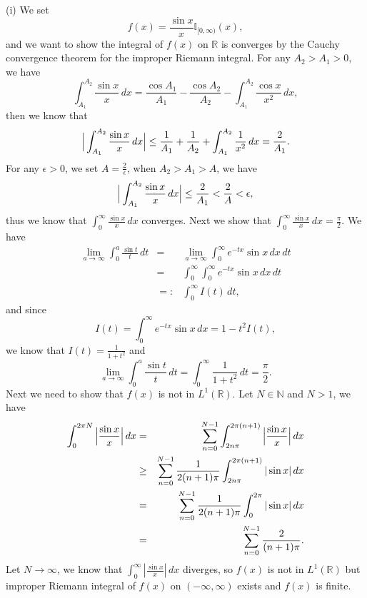\documentclass[12pt]{article}
\begin{document}
(i) We set
\begin{equation*}
    f(x) = \frac{\sin x}{x} \mathbb{I}_{[0, \infty)} (x),
\end{equation*}
and we want to show the integral of $f(x)$ on $\mathbb{R}$ is converges by the Cauchy convergence theorem for the improper Riemann integral. For any $A_{2} > A_{1} > 0$, we have
\begin{equation*}
    \int_{A_{1}}^{A_{2}} \frac{\sin x}{x} \, d x = \frac{\cos A_{1}}{A_{1}} - \frac{\cos A_{2}}{A_{2}} - \int_{A_{1}}^{A_{2}} \frac{\cos x}{x^{2}} \, d x,
\end{equation*}
then we know that
\begin{equation*}
    \Big{|} \int_{A_{1}}^{A_{2}} \frac{\sin x}{x} \, d x \Big{|} \leq \frac{1}{A_{1}} + \frac{1}{A_{2}} + \int_{A_{1}}^{A_{2}} \frac{1}{x^{2}} \, d x = \frac{2}{A_{1}}.
\end{equation*}
For any $\epsilon > 0$, we set $A = \frac{2}{\epsilon}$, when $A_{2} > A_{1} > A$, we have
\begin{equation*}
    \Big{|} \int_{A_{1}}^{A_{2}} \frac{\sin x}{x} \, d x \Big{|} \leq \frac{2}{A_{1}} < \frac{2}{A} < \epsilon,
\end{equation*} 
thus we know that $\int_{0}^{\infty} \frac{\sin x}{x} \, d x$ converges. Next we show that $\int_{0}^{\infty} \frac{\sin x}{x} \, d x = \frac{\pi}{2}$. We have
\begin{eqnarray*}
    \lim_{a \to \infty} \int_{0}^{a} \frac{\sin t}{t} \, d t & = & \lim_{a \to \infty} \int_{0}^{\infty} e^{- t x} \sin x \, d x \, d t \\
    & = & \int_{0}^{\infty} \int_{0}^{\infty} e^{- t x} \sin x \, d x \, d t  \\
    & =: & \int_{0}^{\infty} I(t) \, d t,
\end{eqnarray*}
and since
\begin{equation*}
    I(t) = \int_{0}^{\infty} e^{- t x} \sin x \, d x = 1 - t^{2} I(t),
\end{equation*}
we know that $I(t) = \frac{1}{1+ t^{2}}$ and
\begin{equation*}
    \lim_{a \to \infty} \int_{0}^{a} \frac{\sin t}{t} \, d t = \int_{0}^{\infty} \frac{1}{1+ t^{2}} \, d t = \frac{\pi}{2}.
\end{equation*}
Next we need to show that $f(x)$ is not in $L^{1}(\mathbb{R})$. Let $N \in \mathbb{N}$ and $N > 1$, we have
\begin{eqnarray*}
    \int_{0}^{2 \pi N} \Big{|} \frac{\sin x}{x} \Big{|} \, d x & = & \sum_{n=0}^{N-1} \int_{2n \pi}^{2 \pi (n+1)} \Big{|} \frac{\sin x}{x} \Big{|} \, d x  \\
    & \geq & \sum_{n=0}^{N-1} \frac{1}{2(n+1) \pi} \int_{2n \pi}^{2 \pi (n+1)} |\sin x| \, d x \\
    & = & \sum_{n=0}^{N-1} \frac{1}{2(n+1) \pi} \int_{0}^{2 \pi} |\sin x| \, d x \\
    & = & \sum_{n=0}^{N-1} \frac{2}{(n+1) \pi}.
\end{eqnarray*}
Let $N \to \infty$, we know that $\int_{0}^{\infty} |\frac{\sin x}{x}| \, d x $ diverges, so $f(x)$ is not in $L^{1}(\mathbb{R})$ but improper Riemann integral of $f(x)$ on $(-\infty, \infty)$ exists and $f(x)$ is finite.
\end{document}
